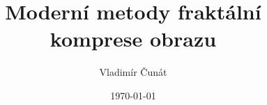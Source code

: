 \frenchspacing


\def\bcTitle{Moderní metody fraktální komprese obrazu}  
\def\bcTitleEn{Contemporary Methods in Fractal Image Compression}
\def\bcAuthor{Vladimír Čunát} 
\def\bcAuthorEn{Vladimir Cunat} 
\def\bcTeacher{RNDr. Tomáš Dvořák, CSc.}
\def\bcTeacherMail{Tomas.Dvorak@mff.cuni.cz}
\def\bcKSVI{Kabinet software a výuky informatiky}

\title{\bcTitle}
\author{\bcAuthor}
\date{\today}





